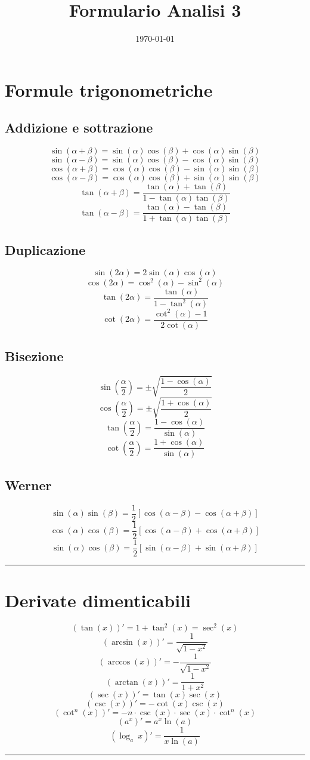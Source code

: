 \documentclass[a4paper,portrait,columns=3,5pt]{cheatsheet}
\title{Formulario Analisi 3}
\author{}
\date{\today}
\begin{document}

\section{Formule trigonometriche}
\subsection{Addizione e sottrazione}
$$\sin (\alpha + \beta) = \sin(\alpha) \cos(\beta) + \cos(\alpha)\sin(\beta)$$
$$\sin(\alpha - \beta) = \sin(\alpha) \cos(\beta) - \cos(\alpha)\sin(\beta)$$
$$\cos(\alpha + \beta) = \cos(\alpha) \cos(\beta) - \sin(\alpha) \sin(\beta)$$
$$\cos(\alpha - \beta) = \cos(\alpha) \cos(\beta) + \sin(\alpha) \sin(\beta)$$
$$\tan(\alpha + \beta) = \frac{\tan(\alpha) + \tan(\beta)}{1 - \tan(\alpha)\tan(\beta)}$$
$$\tan(\alpha - \beta) = \frac{\tan(\alpha) - \tan(\beta)}{1 + \tan(\alpha)\tan(\beta)}$$
\subsection{Duplicazione}
$$\sin(2\alpha) = 2\sin(\alpha)\cos(\alpha)$$
$$\cos(2\alpha) = \cos^2 (\alpha) - \sin^2 (\alpha)$$
$$\tan(2\alpha) = \frac{\tan(\alpha)}{1 - \tan^2(\alpha)}$$
$$\cot(2\alpha) = \frac{\cot^2(\alpha) - 1}{2\cot(\alpha)}$$
\subsection{Bisezione}
$$\sin\left(\frac{\alpha}{2}\right) = \pm \sqrt{\frac{1 - \cos(\alpha)}{2}}$$
$$\cos\left(\frac{\alpha}{2}\right) = \pm \sqrt{\frac{1 + \cos(\alpha)}{2}}$$
$$\tan\left(\frac{\alpha}{2}\right) = {\frac{1 - \cos(\alpha)}{\sin(\alpha)}}$$
$$\cot\left(\frac{\alpha}{2}\right) = {\frac{1 + \cos(\alpha)}{\sin(\alpha)}}$$
\subsection{Werner}
$$\sin(\alpha)\sin(\beta) = \frac{1}{2} \left[\cos(\alpha - \beta) - \cos(\alpha + \beta)\right]$$
$$\cos(\alpha)\cos(\beta) = \frac{1}{2} \left[\cos(\alpha - \beta) + \cos(\alpha + \beta)\right]$$
$$\sin(\alpha)\cos(\beta) = \frac{1}{2} \left[\sin(\alpha - \beta) + \sin(\alpha + \beta)\right]$$
\hrule

\section{Derivate dimenticabili}
$$ (\tan(x))' = 1 + \tan^2(x) = \sec^2(x)$$
$$ (\arcsin(x))' = \frac{1}{\sqrt{1 - x^2}}$$
$$ (\arccos(x))' = - \frac{1}{\sqrt{1 - x^2}}$$
$$ (\arctan(x))' = \frac{1}{1 + x^2}$$
$$ (\sec(x))' = \tan(x)\sec(x)$$
$$ (\csc(x))' = -\cot(x)\csc(x)$$
$$ (\cot^n(x))' = - n \cdot \csc(x) \cdot \sec(x) \cdot \cot^n (x)$$
$$ (a^x)' = a^x \ln(a)$$
$$ (\log_a~x )' = \frac{1}{x\ln(a)}$$
\hrule
\end{document}
